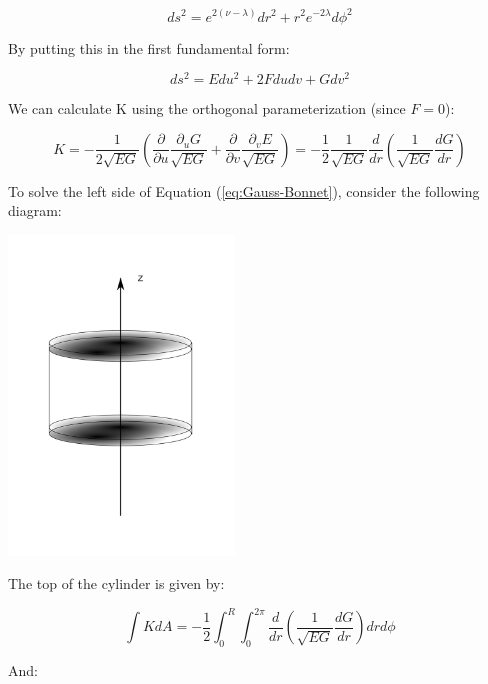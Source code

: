 \documentclass{article}
\begin{document}
\begin{equation}
ds^{2}=e^{2\left(\nu-\lambda\right)}dr^{2}+r^{2}e^{-2\lambda}d\phi^{2}\label{eq:disk-metric}
\end{equation}

By putting this in the first fundamental form\cite{first_fundamental-form}:

\begin{equation}
ds^{2}=Edu^{2}+2Fdudv+Gdv^{2}
\end{equation}

We can calculate K using the orthogonal parameterization\cite{schleifer_condition_1985} (since $F=0$):

\begin{equation}
K=-\frac{1}{2\sqrt{EG}}\left(\frac{\partial}{\partial u}\frac{\partial_{u}G}{\sqrt{EG}}+\frac{\partial}{\partial v}\frac{\partial_{v}E}{\sqrt{EG}}\right)=-\frac{1}{2}\frac{1}{\sqrt{EG}}\frac{d}{dr}\left(\frac{1}{\sqrt{EG}}\frac{dG}{dr}\right)
\end{equation}

To solve the left side of Equation (\ref{eq:Gauss-Bonnet}), consider the following diagram:

\begin{center}
\includegraphics[width=60mm]{Figure3.png}
\end{center}

The top of the cylinder is given by:

\begin{equation}
\int KdA=-\frac{1}{2}\int^{R}_{0}\int^{2\pi}_{0}\frac{d}{dr}\left(\frac{1}{\sqrt{EG}}\frac{dG}{dr}\right)drd\phi
\end{equation}

And:
\end{document}
